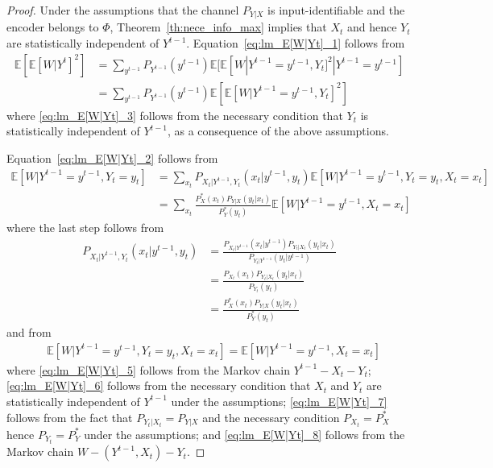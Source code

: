 \documentclass[10pt,a4paper]{amsart}
\newcommand{\E}{\mathbb{E}}
\begin{document}
\begin{proof}
Under the assumptions that the channel $P_{Y|X}$ is input-identifiable and the encoder belongs to $\mathsf\Phi$, Theorem~\ref{th:nece_info_max} implies that $X_t$ and hence $Y_t$ are statistically independent of $Y^{t-1}$.
Equation~\eqref{eq:lm_E[W|Yt]_1} follows from
\begin{align}
\E[\E[W|Y^{t}]^2]  
&= \sum_{y^{t-1}}P_{Y^{t-1}}(y^{t-1}) \E[\E[W|Y^{t-1}=y^{t-1}, Y_t]^2|Y^{t-1}=y^{t-1}] \nonumber\\
&= \sum_{y^{t-1}}P_{Y^{t-1}}(y^{t-1}) \E[\E[W|Y^{t-1}=y^{t-1}, Y_t]^2] \label{eq:lm_E[W|Yt]_3}
\end{align}
where \eqref{eq:lm_E[W|Yt]_3} follows from the necessary condition that $Y_t$ is statistically independent of $Y^{t-1}$, as a consequence of the above assumptions.

Equation~\eqref{eq:lm_E[W|Yt]_2} follows from
\begin{align}
\E[W|Y^{t-1}=y^{t-1}, Y_t=y_t]  
&= \sum_{x_t} P_{X_t|Y^{t-1}, Y_t}(x_t|y^{t-1}, y_t)
\E[W|Y^{t-1}=y^{t-1}, Y_t=y_t, X_t=x_t] \\
&= \sum_{x_t}\frac{P_{X}^*(x_t) P_{Y|X}(y_t|x_t)}{P_{Y}^*(y_t)} \E[W|Y^{t-1}=y^{t-1}, X_t=x_t] 
\end{align}
where the last step follows from
\begin{align}
P_{X_t|Y^{t-1}, Y_t}(x_t|y^{t-1}, y_t) 
&= \frac{P_{X_t|Y^{t-1}}(x_t|y^{t-1})P_{Y_t|X_t}(y_t|x_t)}{P_{Y_t|Y^{t-1}}(y_t|y^{t-1})}  \label{eq:lm_E[W|Yt]_5}\\
&= \frac{P_{X_t}(x_t) P_{Y_t|X_t}(y_t|x_t) }{P_{Y_t}(y_t)}  \label{eq:lm_E[W|Yt]_6} \\
&= \frac{P_{X}^*(x_t) P_{Y|X}(y_t|x_t)}{P_{Y}^*(y_t)}  \label{eq:lm_E[W|Yt]_7}
\end{align}
and from
\begin{align}
&\E[W|Y^{t-1}=y^{t-1}, Y_t=y_t, X_t=x_t] = 
\E[W|Y^{t-1}=y^{t-1}, X_t=x_t]  \label{eq:lm_E[W|Yt]_8}
\end{align}
where \eqref{eq:lm_E[W|Yt]_5} follows from the Markov chain $Y^{t-1}-X_t-Y_t$; 
\eqref{eq:lm_E[W|Yt]_6} follows from the necessary condition that $X_t$ and $Y_t$ are statistically independent of $Y^{t-1}$ under the assumptions;
\eqref{eq:lm_E[W|Yt]_7} follows from the fact that $P_{Y_t|X_t}=P_{Y|X}$ and the necessary condition $P_{X_t}=P_X^*$ hence $P_{Y_t}=P_Y^*$ under the assumptions; 
and 
\eqref{eq:lm_E[W|Yt]_8} follows from the Markov chain $W - (Y^{t-1},X_t) - Y_t$.
\end{proof}
\end{document}

